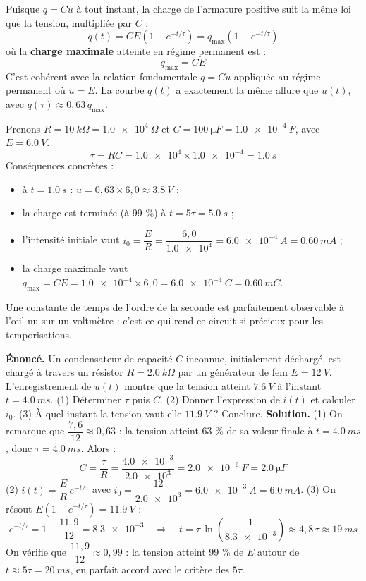 \documentclass[11pt]{article}
\newcounter{popsec}
\newcounter{popsub}
\newcommand{\courssub}[1]{%
  \stepcounter{popsub}%
  \par\vspace{9pt}\noindent{\popxbold\fontsize{11.5}{13}\selectfont\color{popink}{\color{poporange}\thepopsec.\thepopsub}\hspace{6pt}#1}\par\nopagebreak\vspace{4pt}
}
\begin{document}
Puisque $q = Cu$ à tout instant, la charge de l'armature positive suit la même loi que la tension, multipliée par $C$ :
\[ q(t) = CE\left(1 - e^{-t/\tau}\right) = q_{\max}\left(1 - e^{-t/\tau}\right) \]
où la \textbf{charge maximale} atteinte en régime permanent est :
\[ q_{\max} = CE \]
C'est cohérent avec la relation fondamentale $q = Cu$ appliquée au régime permanent où $u = E$. La courbe $q(t)$ a exactement la même allure que $u(t)$, avec $q(\tau) \approx 0,63\,q_{\max}$.

\courssub{Exemple chiffré et exercice résolu}

\begin{exemplebox}
Prenons $R = \SI{10}{k\Omega} = \SI{1,0e4}{\Omega}$ et $C = \SI{100}{\micro F} = \SI{1,0e-4}{F}$, avec $E = \SI{6,0}{V}$.
\[ \tau = RC = \num{1,0e4} \times \num{1,0e-4} = \SI{1,0}{s} \]
Conséquences concrètes :
\begin{itemize}
\item à $t = \SI{1,0}{s}$ : $u = 0,63 \times 6,0 \approx \SI{3,8}{V}$ ;
\item la charge est terminée (à 99 \%) à $t = 5\tau = \SI{5,0}{s}$ ;
\item l'intensité initiale vaut $i_0 = \dfrac{E}{R} = \dfrac{6,0}{\num{1,0e4}} = \SI{6,0e-4}{A} = \SI{0,60}{mA}$ ;
\item la charge maximale vaut $q_{\max} = CE = \num{1,0e-4} \times 6,0 = \SI{6,0e-4}{C} = \SI{0,60}{mC}$.
\end{itemize}
Une constante de temps de l'ordre de la seconde est parfaitement observable à l'œil nu sur un voltmètre : c'est ce qui rend ce circuit si précieux pour les temporisations.
\end{exemplebox}

\begin{exoresolu}
\textbf{Énoncé.} Un condensateur de capacité $C$ inconnue, initialement déchargé, est chargé à travers un résistor $R = \SI{2,0}{k\Omega}$ par un générateur de fem $E = \SI{12}{V}$. L'enregistrement de $u(t)$ montre que la tension atteint $\SI{7,6}{V}$ à l'instant $t = \SI{4,0}{ms}$. (1) Déterminer $\tau$ puis $C$. (2) Donner l'expression de $i(t)$ et calculer $i_0$. (3) À quel instant la tension vaut-elle $\SI{11,9}{V}$ ? Conclure.
\tcblower
\textbf{Solution.} (1) On remarque que $\dfrac{7,6}{12} \approx 0,63$ : la tension atteint 63 \% de sa valeur finale à $t = \SI{4,0}{ms}$, donc $\tau = \SI{4,0}{ms}$. Alors :
\[ C = \frac{\tau}{R} = \frac{\num{4,0e-3}}{\num{2,0e3}} = \SI{2,0e-6}{F} = \SI{2,0}{\micro F} \]
(2) $i(t) = \dfrac{E}{R}\,e^{-t/\tau}$ avec $i_0 = \dfrac{12}{\num{2,0e3}} = \SI{6,0e-3}{A} = \SI{6,0}{mA}$.
(3) On résout $E\left(1 - e^{-t/\tau}\right) = \SI{11,9}{V}$ :
\[ e^{-t/\tau} = 1 - \frac{11,9}{12} = \num{8,3e-3} \quad\Rightarrow\quad t = \tau\,\ln\!\left(\frac{1}{\num{8,3e-3}}\right) \approx 4,8\,\tau \approx \SI{19}{ms} \]
On vérifie que $\dfrac{11,9}{12} \approx 0,99$ : la tension atteint 99 \% de $E$ autour de $t \approx 5\tau = \SI{20}{ms}$, en parfait accord avec le critère des $5\tau$.
\end{exoresolu}
\end{document}
